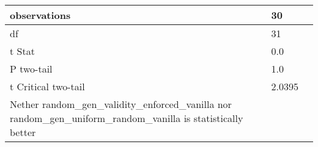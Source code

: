 \documentclass[11pt]{article}
\begin{document}
\begin{table}[]
{\begin{tabular}{|l|l|l|}
    observations                                                                                                      & 30                                    &                                          \\ \hline
    df                                                                                                                & 31                                    &                                          \\ \hline
    t Stat                                                                                                            & 0.0                                   &                                          \\ \hline
    P two-tail                                                                                                        & 1.0                                   &                                          \\ \hline
    t Critical two-tail                                                                                               & 2.0395                                &                                          \\ \hline
    Nether random\_gen\_validity\_enforced\_vanilla nor random\_gen\_uniform\_random\_vanilla is statistically better &                                       &                                          \\ \hline
    \end{tabular}%
    }
\end{table}
\end{document}
